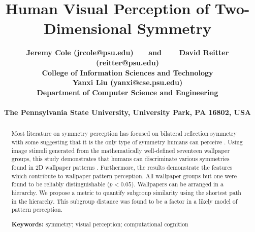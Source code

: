 \documentclass[10pt,letterpaper]{article}
\title{Human Visual Perception of Two-Dimensional Symmetry}
\author{\large \bf Jeremy Cole {(jrcole@psu.edu)}  ~~~\textnormal{and}
  ~~~ \large \bf David Reitter {(reitter@psu.edu)}  \\
College of Information Sciences and Technology \\
  \AND \large \bf Yanxi Liu {(yanxi@cse.psu.edu)} \\
  Department of Computer Science and Engineering \\
\\
The Pennsylvania State University, University Park, PA 16802, USA
}
\newcommand{\citep}[1]{\cite{#1}}
\begin{document}
\maketitle


\begin{abstract}
Most literature on symmetry perception has focused on bilateral reflection symmetry with some suggesting that it is the only type of symmetry humans can perceive \citep{bio}. Using image stimuli generated from the mathematically well-defined seventeen wallpaper groups, this study demonstrates that humans can discriminate various symmetries found in 2D wallpaper patterns \citep{yanxitrends}. Furthermore, the results demonstrate the features which contribute to wallpaper pattern perception. All wallpaper groups but one were found to be reliably distinguishable ($p<0.05$). Wallpapers can be arranged in a hierarchy. We propose a metric to quantify subgroup similarity using the shortest path in the hierarchy. This subgroup distance was found to be a factor in a likely model of pattern perception. 

\textbf{Keywords:} 
symmetry; visual perception; computational cognition
\end{abstract}



%








{
\renewcommand{\bibliographytypesize}{\small}
\setlength{\bibleftmargin}{.125in}
\setlength{\bibindent}{-\bibleftmargin}

}
\end{document}
